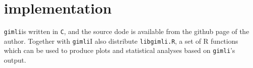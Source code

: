 \documentclass[11pt]{amsart}
\newcommand{\gimli}{\texttt{gimli}}
\begin{document}
\section{implementation}

\gimli is written in \texttt{C}, and the source
dode is available from the github page of the author. Together
with \gimli I also distribute \texttt{libgimli.R},
a set of R functions which can be used to produce plots and statistical
analyses based on \gimli's output.


\end{document}
